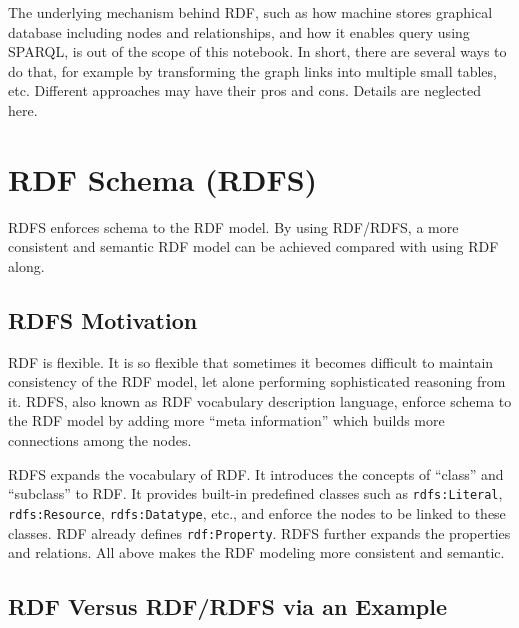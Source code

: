 The underlying mechanism behind RDF, such as how machine stores graphical database including nodes and relationships, and how it enables query using SPARQL, is out of the scope of this notebook. In short, there are several ways to do that, for example by transforming the graph links into multiple small tables, etc. Different approaches may have their pros and cons. Details are neglected here.

\section{RDF Schema (RDFS)}

RDFS enforces schema to the RDF model. By using RDF/RDFS, a more consistent and semantic RDF model can be achieved compared with using RDF along.

\subsection{RDFS Motivation}

RDF is flexible. It is so flexible that sometimes it becomes difficult to maintain consistency of the RDF model, let alone performing sophisticated reasoning from it. RDFS, also known as RDF vocabulary description language, enforce schema to the RDF model by adding more ``meta information'' which builds more connections among the nodes.

RDFS expands the vocabulary of RDF. It introduces the concepts of ``class'' and ``subclass'' to RDF. It provides built-in predefined classes such as \verb|rdfs:Literal|, \verb|rdfs:Resource|, \verb|rdfs:Datatype|, etc., and enforce the nodes to be linked to these classes. RDF already defines \verb|rdf:Property|. RDFS further expands the properties and relations. All above makes the RDF modeling more consistent and semantic.

\subsection{RDF Versus RDF/RDFS via an Example}

